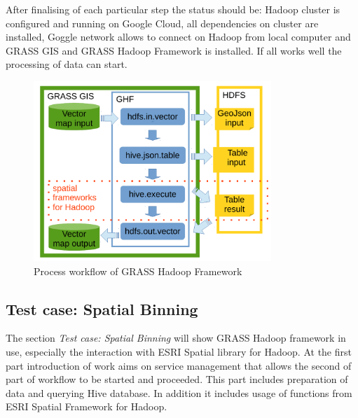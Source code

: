 \documentclass[a4paper,12pt,oneside]{report}
\begin{document}
	After finalising of each particular step the status should be: Hadoop cluster is configured and running on Google Cloud, all dependencies on cluster are installed, Goggle network allows to connect on Hadoop from local computer and GRASS GIS and GRASS Hadoop Framework is installed. If all works well the processing of data can start. 
		\begin{figure}[!htbp]
			\centering
			\includegraphics[width=0.8\textwidth]{./img/modules_schema.pdf}
			\caption[GHF workflow]{\centering Process workflow of GRASS Hadoop Framework 
			}
			\label{wokrflow}
		\end{figure} 
		
	
	        \subsection{Test case: Spatial Binning}\label{spatial_anal_usage}

	The section \textit{Test case: Spatial Binning} will show GRASS Hadoop framework in use, especially 
	the interaction with ESRI Spatial library for Hadoop. 
	At the first part introduction of work aims on service management that allows 
	the second of part of workflow to be started and proceeded. This part includes preparation of data
	and querying Hive database. In addition it includes usage of functions from ESRI
	Spatial Framework for Hadoop.
	
\end{document}
